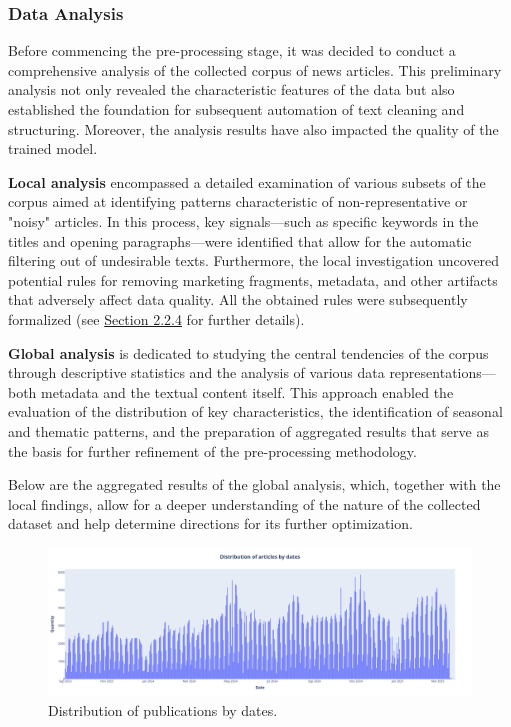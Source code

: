 \subsubsection{Data Analysis}
\label{sec:data_analysis}
Before commencing the pre-processing stage, it was decided to conduct a comprehensive analysis of the collected corpus of news articles.
This preliminary analysis not only revealed the characteristic features of the data but also established the foundation for subsequent
automation of text cleaning and structuring. Moreover, the analysis results have also impacted the quality of the trained model.

\textbf{Local analysis} encompassed a detailed examination of various subsets of the corpus aimed at identifying patterns characteristic
of non-representative or "noisy" articles. In this process, key signals—such as specific keywords in the titles and opening paragraphs—were
identified that allow for the automatic filtering out of undesirable texts. Furthermore, the local investigation uncovered potential
rules for removing marketing fragments, metadata, and other artifacts that adversely affect data quality.
All the obtained rules were subsequently formalized (see \hyperref[sec:data_prep]{Section 2.2.4} for further details).

\textbf{Global analysis} is dedicated to studying the central tendencies of the corpus through descriptive statistics and the analysis
of various data representations—both metadata and the textual content itself. This approach enabled the evaluation of the distribution
of key characteristics, the identification of seasonal and thematic patterns, and the preparation of aggregated results that serve
as the basis for further refinement of the pre-processing methodology.

Below are the aggregated results of the global analysis, which, together with the local findings, allow for a deeper understanding
of the nature of the collected dataset and help determine directions for its further optimization.

\begin{figure}[H]
    \centering
    \includegraphics[width=1\linewidth]{img/articles_dist_by_dates.png}
    \caption{Distribution of publications by dates.}
    \label{fig:dist_by_dates}
\end{figure}

